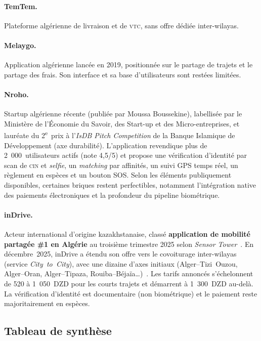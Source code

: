 \paragraph{TemTem.} Plateforme algérienne de livraison et de \textsc{vtc}, sans offre dédiée inter-wilayas.

\paragraph{Melaygo.} Application algérienne lancée en 2019, positionnée sur le partage de trajets et le partage des frais. Son interface et sa base d'utilisateurs sont restées limitées.

\paragraph{Nroho.} Startup algérienne récente (publiée par Moussa Boussekine), labellisée par le Ministère de l'Économie du Savoir, des Start-up et des Micro-entreprises, et lauréate du 2\textsuperscript{e}~prix à l'\textit{IsDB Pitch Competition} de la Banque Islamique de Développement (axe durabilité). L'application revendique plus de 2~000~utilisateurs actifs (note 4,5/5) et propose une vérification d'identité par scan de \textsc{cin} et \textit{selfie}, un \textit{matching} par affinités, un suivi GPS temps réel, un règlement en espèces et un bouton SOS. Selon les éléments publiquement disponibles, certaines briques restent perfectibles, notamment l'intégration native des paiements électroniques et la profondeur du pipeline biométrique.

\paragraph{inDrive.} Acteur international d'origine kazakhstanaise, classé \textbf{application de mobilité partagée \#1 en Algérie} au troisième trimestre 2025 selon \textit{Sensor Tower}~\cite{sensortower_algeria_2025}. En décembre~2025, inDrive a étendu son offre vers le covoiturage inter-wilayas (service \textit{City~to~City}), avec une dizaine d'axes initiaux (Alger--Tizi~Ouzou, Alger--Oran, Alger--Tipaza, Rouiba--Béjaïa\dots)~\cite{indrive_interwilaya_2025}. Les tarifs annoncés s'échelonnent de 520 à 1~050~DZD pour les courts trajets et démarrent à 1~300~DZD au-delà. La vérification d'identité est documentaire (non biométrique) et le paiement reste majoritairement en espèces.

\subsection{Tableau de synthèse}

